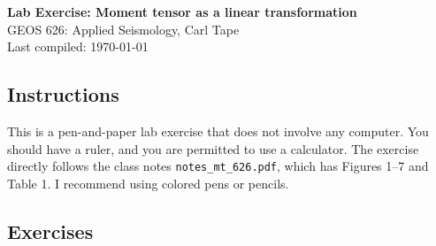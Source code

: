 \documentclass[11pt,titlepage,fleqn]{article}
\newcommand{\mtfile}{\texttt{notes\_mt\_626.pdf}}
\begin{document}

\begin{spacing}{1.2}
\centering
{\large \bf Lab Exercise: Moment tensor as a linear transformation} \\
GEOS 626: Applied Seismology, Carl Tape \\
Last compiled: \today
\end{spacing}


\subsection*{Instructions}

This is a pen-and-paper lab exercise that does not involve any computer. You should have a ruler, and you are permitted to use a calculator. The exercise directly follows the class notes \mtfile, which has Figures 1--7 and Table 1. I recommend using colored pens or pencils.


\subsection*{Exercises}
\end{document}
